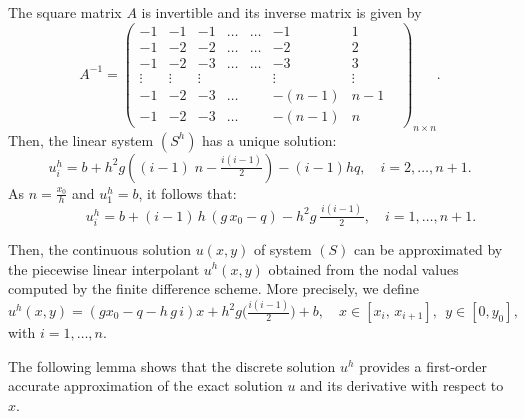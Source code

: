 \documentclass[axioms,article,submit,moreauthors]{Definitions/mdpi}
\begin{document}
     
    \noindent The square matrix $A$ is invertible and its inverse matrix is given by
\[A^{-1}=\begin{pmatrix}
-1 & -1 & -1 & \ldots & \ldots & -1 & 1 &\\                                                                                                   
-1 & -2 & -2 & \ldots & \ldots & -2 & 2 &\\                                                                                                   
-1 & -2 & -3 & \ldots & \ldots & -3 & 3 &\\                                                                                                   
\vdots & \vdots & \vdots  &&& \vdots  & \vdots\\
-1& -2 & -3 &\ldots && -(n-1) & n-1\\
 -1 & -2& -3& \ldots &  &-(n-1) &n
\end{pmatrix}_{n\times n}.\]
Then, the linear system ${(S^h)}$ has a unique solution:
\[ {u^h_{i}}= b+  h^2g  \left( (i-1) \;n-\tfrac{i(i-1)}{2}\right)-(i-1) hq,\quad i=2 ,\ldots, n+1.\]   
As $n=\tfrac{x_0}{h}$ {and $u^h_1=b$}, it follows that:
    \[ \qquad\quad {u^h_i} = b + (i-1) \,h \,(g\,x_0-q) -  h^2 g \, \tfrac{\,i(i-1)\,}{2},\quad i=1, \ldots, n+1. \]
    
 
    
    
 Then, the continuous solution $u(x,y)$ of system $(S)$ can be approximated by the piecewise linear interpolant {$u^h(x,y)$} obtained from the nodal values computed by the finite difference scheme. More precisely, we define
          \begin{equation}\label{Def uh}
    	    {u^h}(x, y)= (g x_0  - q - h\, g\, i) x + h^2 g \Big(\tfrac{i(i-1)}{2}\Big) + b,\quad x \in [x_i, \,x_{i+1}], \,   \;y\in [0, y_0], 
          \end{equation}
with $i=1, \ldots , n.$

The following lemma{ shows that the discrete solution ${u^h}$ provides a first-order accurate approximation of the exact solution $u$ and its derivative with respect to $x$.}
\end{document}
